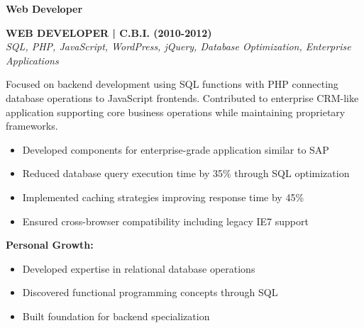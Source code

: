\documentclass[a4paper,10pt]{article}
\begin{document}
\vspace{0.5cm}
\noindent
\colorbox{leadershipbg}{%
	\begin{minipage}{\dimexpr\textwidth-2\fboxsep\relax}
		\vspace{0.2cm}

		{\large\bfseries\color{darkblue}\selectfont Web Developer}
		\vspace{0.3cm}

		\noindent\textbf{WEB DEVELOPER | C.B.I. (2010-2012)} \\
		\vspace{0.1cm}
		{\small\textit{SQL, PHP, JavaScript, WordPress, jQuery, Database Optimization, Enterprise Applications}}
		\vspace{0.2cm}

		Focused on backend development using SQL functions with PHP connecting database operations to JavaScript frontends. Contributed to enterprise CRM-like application supporting core business operations while maintaining proprietary frameworks.

		\vspace{0.2cm}
		\begin{itemize}[label=\textcolor{darkblue}{\textbullet}, leftmargin=*, nosep]
			\item Developed components for enterprise-grade application similar to SAP
			\item Reduced database query execution time by 35\% through SQL optimization
			\item Implemented caching strategies improving response time by 45\%
			\item Ensured cross-browser compatibility including legacy IE7 support
		\end{itemize}

		\vspace{0.2cm}
		\textbf{Personal Growth:}
		\vspace{0.2cm}
		\begin{itemize}[label=\textcolor{darkblue}{\textbullet}, leftmargin=*, nosep]
			\item Developed expertise in relational database operations
			\item Discovered functional programming concepts through SQL
			\item Built foundation for backend specialization
		\end{itemize}

		\vspace{0.4cm}


\end{minipage}}
\end{document}
